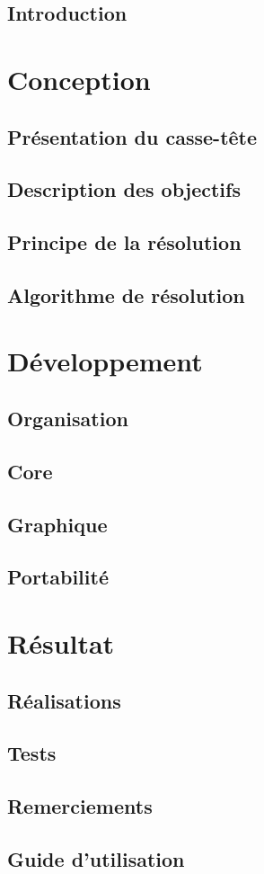\documentclass[a4paper,10pt]{report}
\begin{document}
\tableofcontents

\chapter*{Introduction}


\part{Conception}
\chapter{Présentation du casse-tête}

\chapter{Description des objectifs} 
 
\chapter{Principe de la résolution}

\chapter{Algorithme de résolution}


\part{Développement}
\chapter{Organisation}

\chapter{Core}\label{ch6}

\chapter{Graphique}

\chapter{Portabilité}


\part{Résultat}
\chapter{Réalisations}

\chapter{Tests}\label{Tests}


\chapter*{Remerciements}

\appendix
\chapter*{Guide d'utilisation}


\listoffigures
\lstlistoflistings

\printindex
\end{document}
